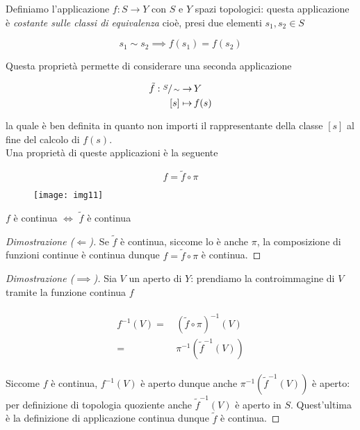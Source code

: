 Definiamo l'applicazione $ f : S \to Y $ con $ S $ e $ Y $ spazi topologici: questa applicazione è \textit{costante sulle classi di equivalenza} cioè, presi due elementi $ s_{1},s_{2} \in S $

\begin{equation}
	s_{1} \sim s_{2} \implies f(s_{1}) = f(s_{2})
\end{equation}

Questa proprietà permette di considerare una seconda applicazione

\begin{align}
	\begin{split}
		\tilde{f} : \sfrac{S}{\sim} \to& \, Y\\
		[s] \mapsto& \, f(s)
	\end{split}
\end{align}

la quale è ben definita in quanto non importi il rappresentante della classe $ [s] $ al fine del calcolo di $ f(s) $.\\
Una proprietà di queste applicazioni è la seguente

\begin{equation}
	f = \tilde{f} \circ \pi
\end{equation}

\begin{figure}[H]
	\centering
	\texttt{[image: img11]}
\end{figure}

\begin{definition}
	$ f $ è continua $ \iff $ $ \tilde{f} $ è continua
\end{definition}

\begin{proof}[Dimostrazione ($ \Longleftarrow $)]
	Se $ \tilde{f} $ è continua, siccome lo è anche $ \pi $, la composizione di funzioni continue è continua dunque $ f = \tilde{f} \circ \pi $ è continua.
\end{proof}

\begin{proof}[Dimostrazione ($ \implies $)]
	Sia $ V $ un aperto di $ Y $: prendiamo la controimmagine di $ V $ tramite la funzione continua $ f $
	
	\begin{align}
		\begin{split}
			f^{-1}(V) =& \, (\tilde{f} \circ \pi)^{-1}(V)\\
			=& \, \pi^{-1}(\tilde{f}^{-1}(V))
		\end{split}
	\end{align}

	Siccome $ f $ è continua, $ f^{-1}(V) $ è aperto dunque anche $ \pi^{-1}(\tilde{f}^{-1}(V)) $ è aperto: per definizione di topologia quoziente anche $ \tilde{f}^{-1}(V) $ è aperto in $ S $. Quest'ultima è la definizione di applicazione continua dunque $ \tilde{f} $ è continua.
\end{proof}

